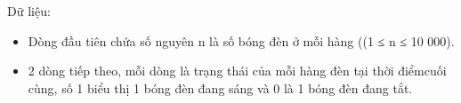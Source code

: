 Dữ liệu:
\begin{itemize}
	\item     Dòng đầu tiên chứa số nguyên n là số bóng đèn ở mỗi hàng ((1 ≤ n ≤ 10 000).   
	\item     2 dòng tiếp theo, mỗi dòng là trạng thái của mỗi hàng đèn tại thời điểmcuối cùng, số 1 biểu thị 1 bóng đèn đang sáng và 0 là 1 bóng đèn đang tắt.   
\end{itemize}